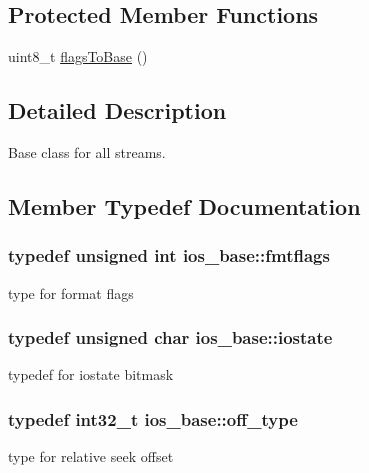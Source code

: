 \subsection*{Protected Member Functions}
\begin{DoxyCompactItemize}
\item 
uint8\+\_\+t \hyperlink{classios__base_a19ffb796cb95d3744d9bc7739939acf2}{flags\+To\+Base} ()
\end{DoxyCompactItemize}


\subsection{Detailed Description}
Base class for all streams. 

\subsection{Member Typedef Documentation}
\subsubsection[{\texorpdfstring{fmtflags}{fmtflags}}]{\setlength{\rightskip}{0pt plus 5cm}typedef unsigned int {\bf ios\+\_\+base\+::fmtflags}}\hypertarget{classios__base_ac9a54e52cef4f01ac0afd8ae896a3413}{}\label{classios__base_ac9a54e52cef4f01ac0afd8ae896a3413}
type for format flags 
\subsubsection[{\texorpdfstring{iostate}{iostate}}]{\setlength{\rightskip}{0pt plus 5cm}typedef unsigned char {\bf ios\+\_\+base\+::iostate}}\hypertarget{classios__base_aef19291eeae0f072ac42c6ba1fe3033c}{}\label{classios__base_aef19291eeae0f072ac42c6ba1fe3033c}
typedef for iostate bitmask 
\subsubsection[{\texorpdfstring{off\+\_\+type}{off_type}}]{\setlength{\rightskip}{0pt plus 5cm}typedef int32\+\_\+t {\bf ios\+\_\+base\+::off\+\_\+type}}\hypertarget{classios__base_a45de7cca0d01da781f4b886179c65c22}{}\label{classios__base_a45de7cca0d01da781f4b886179c65c22}
type for relative seek offset 
